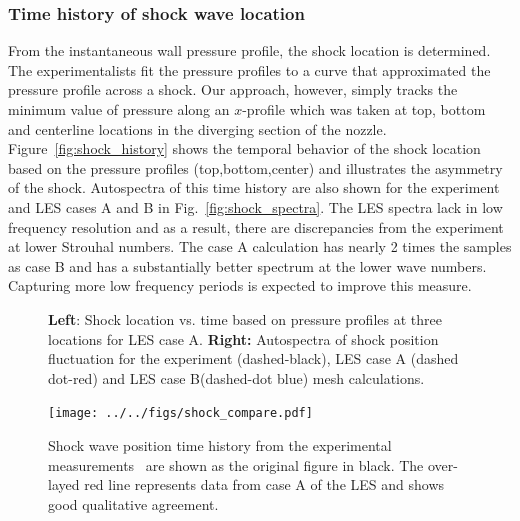\documentclass[]{aiaa-tc}%
\begin{document}
\subsubsection{Time history of shock wave location }

From the instantaneous wall pressure profile, the shock location is determined.  The experimentalists fit the pressure profiles to a curve that approximated the pressure profile across a shock.  Our approach, however, simply tracks the minimum value of pressure along an $x$-profile which was taken at top, bottom and centerline locations in the diverging section of the nozzle.  Figure~\ref{fig:shock_history} shows the temporal behavior of the shock location based on the pressure profiles (top,bottom,center) and illustrates the asymmetry of the shock.  Autospectra of this time history are also shown for the experiment and LES cases A and B in Fig.~\ref{fig:shock_spectra}.  The LES spectra lack in low frequency resolution and as a result, there are discrepancies from the experiment at lower Strouhal numbers.  The case A calculation has nearly 2 times the samples as case B and has a substantially better spectrum at the lower wave numbers.  Capturing more low frequency periods is expected to improve this measure.  



\begin{figure}[!h]%
	\centering
 	\caption{ {\bf Left}: Shock location vs. time based on pressure profiles at three locations for LES case A. {\bf Right:} Autospectra of shock position fluctuation for the experiment (dashed-black), LES case A (dashed dot-red) and LES case B(dashed-dot blue) mesh calculations. }
 	
\end{figure}


\begin{figure}[!h]
	\begin{centering}
	\texttt{[image: ../../figs/shock\_compare.pdf]}
	\caption{ Shock wave position time history from the experimental measurements~\cite{Papam:10} are shown as the original figure in black.  The over-layed red line represents data from case A of the LES and shows good qualitative agreement.
 	\label{fig:shock_compare}
	}
	\end{centering}
\end{figure}
\end{document}
